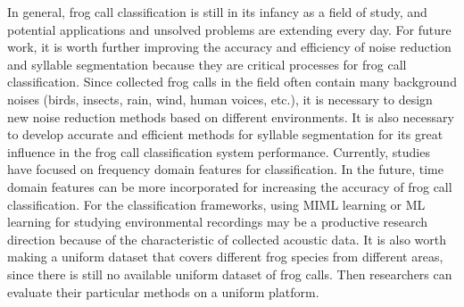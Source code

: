 In general, frog call classification is still in its infancy as a field of study, and potential applications and unsolved problems are extending every day. For future work, it is worth further improving the accuracy and efficiency of noise reduction and syllable segmentation because they are critical processes for frog call classification. Since collected frog calls in the field often contain many background noises (birds, insects, rain, wind, human voices, etc.), it is necessary to design new noise reduction methods based on different environments. It is also necessary to develop accurate and efficient methods for syllable segmentation for its great influence in the frog call classification system performance. Currently, studies have focused on frequency domain features for classification. In the future, time domain features can be more incorporated for increasing the accuracy of frog call classification. For the classification frameworks, using MIML learning or ML learning for studying environmental recordings may be a productive research direction because of the characteristic of collected acoustic data. It is also worth making a uniform dataset that covers different frog species from different areas, since there is still no available uniform dataset of frog calls. Then researchers can evaluate their particular methods on a uniform platform.




